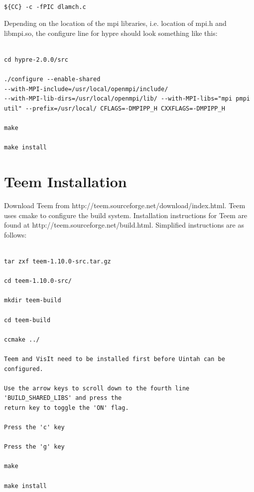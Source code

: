 \documentclass[12pt]{article}
\begin{document}
\begin{verbatim}

${CC} -c -fPIC dlamch.c

\end{verbatim}

Depending on the location of the mpi libraries, i.e. location of mpi.h
and libmpi.so, the configure line for hypre should look something like this:

\begin{Verbatim}

cd hypre-2.0.0/src

./configure --enable-shared
--with-MPI-include=/usr/local/openmpi/include/
--with-MPI-lib-dirs=/usr/local/openmpi/lib/ --with-MPI-libs="mpi pmpi
util" --prefix=/usr/local/ CFLAGS=-DMPIPP_H CXXFLAGS=-DMPIPP_H

make

make install

\end{Verbatim}

 

\section{Teem Installation}
\label{sec:teem}


Download Teem from http://teem.sourceforge.net/download/index.html.  Teem uses cmake to configure the build system. Installation instructions for Teem are found at http://teem.sourceforge.net/build.html.  Simplified instructions are as follows:

\begin{verbatim}

tar zxf teem-1.10.0-src.tar.gz

cd teem-1.10.0-src/

mkdir teem-build

cd teem-build

ccmake ../

Teem and VisIt need to be installed first before Uintah can be configured.

Use the arrow keys to scroll down to the fourth line 'BUILD_SHARED_LIBS' and press the 
return key to toggle the 'ON' flag.

Press the 'c' key

Press the 'g' key

make

make install

\end{verbatim}
\end{document}
